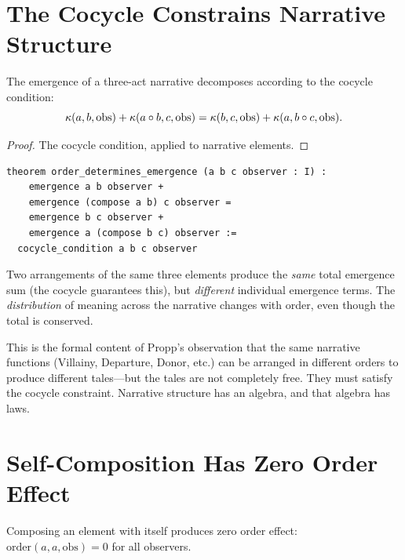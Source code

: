\section{The Cocycle Constrains Narrative Structure}

\begin{theorem}
\label{thm:narrative-cocycle}
The emergence of a three-act narrative decomposes according to
the cocycle condition:
\[
  \kappa(a, b, \mathrm{obs}) + \kappa(a \circ b, c, \mathrm{obs})
  = \kappa(b, c, \mathrm{obs}) + \kappa(a, b \circ c, \mathrm{obs}).
\]
\end{theorem}

\begin{proof}
The cocycle condition, applied to narrative elements.
\end{proof}

\begin{lstlisting}
theorem order_determines_emergence (a b c observer : I) :
    emergence a b observer +
    emergence (compose a b) c observer =
    emergence b c observer +
    emergence a (compose b c) observer :=
  cocycle_condition a b c observer
\end{lstlisting}

\begin{remark}
Two arrangements of the same three elements produce the \emph{same}
total emergence sum (the cocycle guarantees this), but \emph{different}
individual emergence terms.  The \emph{distribution} of meaning across
the narrative changes with order, even though the total is conserved.

This is the formal content of Propp's observation that the same narrative
functions (Villainy, Departure, Donor, etc.) can be arranged in different
orders to produce different tales---but the tales are not completely free.
They must satisfy the cocycle constraint.  Narrative structure has an
algebra, and that algebra has laws.
\end{remark}

\section{Self-Composition Has Zero Order Effect}

\begin{theorem}
\label{thm:self-order}
Composing an element with itself produces zero order effect:
$\mathrm{order}(a, a, \mathrm{obs}) = 0$ for all observers.
\end{theorem}

